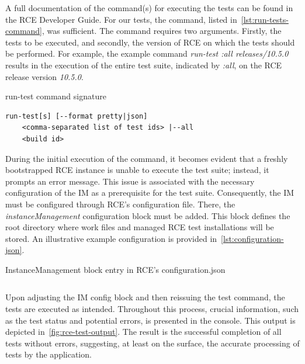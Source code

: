 A full documentation of the command(s) for executing the tests can be found in the \ac{RCE} Developer Guide. For our tests, the command, listed in~\cref{lst:run-tests-command}, was sufficient. The command requires two arguments. Firstly, the tests to be executed, and secondly, the version of \ac{RCE} on which the tests should be performed. For example, the example command \textit{run-test :all releases/10.5.0} results in the execution of the entire test suite, indicated by \textit{:all}, on the \ac{RCE} release version \textit{10.5.0}.

\begin{listing}[ht]
\caption{run-test command signature}
\label{lst:run-tests-command}
\begin{verbatim}
run-test[s] [--format pretty|json] 
    <comma-separated list of test ids> |--all
    <build id>
\end{verbatim}
\end{listing}


During the initial execution of the command, it becomes evident that a freshly bootstrapped \ac{RCE} instance is unable to execute the test suite; instead, it prompts an error message. This issue is associated with the necessary configuration of the \ac{IM} as a prerequisite for the test suite. Consequently, the \ac{IM} must be configured through \ac{RCE}'s configuration file. There, the \textit{instanceManagement} configuration block must be added. This block defines the root directory where work files and managed RCE test installations will be stored. An illustrative example configuration is provided in~\cref{lst:configuration-json}.

\begin{listing}
\caption{InstanceManagement block entry in \ac{RCE}'s configuration.json}
\label{lst:configuration-json}
\inputminted{json}{files/code/configuration.json}
\end{listing}

Upon adjusting the \ac{IM} config block and then reissuing the test command, the tests are executed as intended. Throughout this process, crucial information, such as the test status and potential errors, is presented in the console. This output is depicted in~\cref{fig:rce-test-output}. The result is the successful completion of all tests without errors, suggesting, at least on the surface, the accurate processing of tests by the application.

